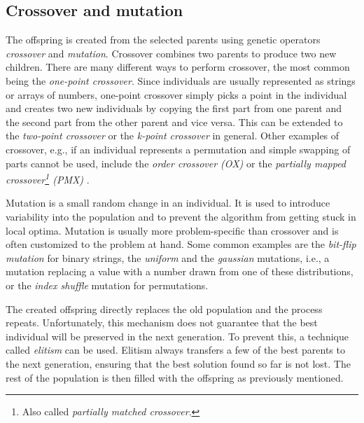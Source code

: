 \subsection{Crossover and mutation}

The offspring is created from the selected parents using genetic operators \textit{crossover} and \textit{mutation}. Crossover combines two parents to produce two new children. There are many different ways to perform crossover, the most common being the \textit{one-point crossover}. Since individuals are usually represented as strings or arrays of numbers, one-point crossover simply picks a point in the individual and creates two new individuals by copying the first part from one parent and the second part from the other parent and vice versa. This can be extended to the \textit{two-point crossover} or the \textit{k-point crossover} in general. Other examples of crossover, e.g., if an individual represents a permutation and simple swapping of parts cannot be used, include the \textit{order crossover (OX)} or the \textit{partially mapped crossover\footnote{Also called \textit{partially matched crossover}.} (PMX)} \cite{vanneschi2023lectures}.

Mutation is a small random change in an individual. It is used to introduce variability into the population and to prevent the algorithm from getting stuck in local optima. Mutation is usually more problem-specific than crossover and is often customized to the problem at hand. Some common examples are the \textit{bit-flip mutation} for binary strings, the \textit{uniform} and the \textit{gaussian} mutations, i.e., a mutation replacing a value with a number drawn from one of these distributions, or the \textit{index shuffle} mutation for permutations.

\bigskip

The created offspring directly replaces the old population and the process repeats. Unfortunately, this mechanism does not guarantee that the best individual will be preserved in the next generation. To prevent this, a technique called \textit{elitism} can be used. Elitism always transfers a few of the best parents to the next generation, ensuring that the best solution found so far is not lost. The rest of the population is then filled with the offspring as previously mentioned.


